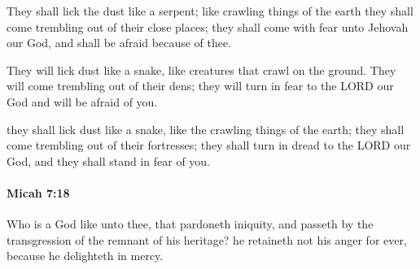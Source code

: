 			\begin{versebox}
					\item[BHS] 
					\item[LXX] 
					\item[ASV] They shall lick the dust like a serpent; like crawling things of the earth they shall come trembling out of their close places; they shall come with fear unto Jehovah our God, and shall be afraid because of thee.
					\item[NIV] They will lick dust like a snake, like creatures that crawl on the ground. They will come trembling out of their dens; they will turn in fear to the LORD our God and will be afraid of you.
					\item[NRSV] they shall lick dust like a snake, like the crawling things of the earth; they shall come trembling out of their fortresses; they shall turn in dread to the LORD our God, and they shall stand in fear of you.
			\end{versebox}

		\paragraph{Micah 7:18} %
			\label{MICAH-7-18}

			Who is a God like unto thee, that pardoneth iniquity, and passeth by the transgression of the remnant of his heritage? he retaineth not his anger for ever, because he delighteth in mercy.

